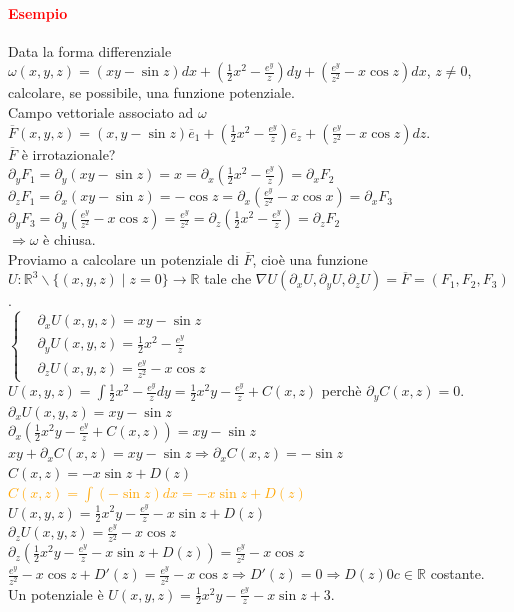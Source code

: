\documentclass{article}
\newcommand{\R}{\mathbb{R}}
\begin{document}
\paragraph{\textcolor{red}{Esempio}}
Data la forma differenziale $\omega(x,y,z)=(xy-\sin z)dx +\left(\frac{1}{2}x^2-\frac{e^y}{z} \right)dy+\left( \frac{e^y}{z^2}-x\cos z \right)dx$, $z \neq 0$, calcolare, se possibile, una funzione potenziale.\\
Campo vettoriale associato ad $\omega$\\
$\overline{F}(x,y,z)=(x,y-\sin z)\overline{e}_1+\left( \frac{1}{2}x^2-\frac{e^y}{z} \right) \overline{e}_z+\left( \frac{e^y}{z^2}-x\cos z \right)dz$.\\
$\overline{F}$ è irrotazionale?\\
$\partial_yF_1=\partial_y(xy-\sin z)=x=\partial_x\left( \frac{1}{2}x^2-\frac{e^y}{z} \right)= \partial_xF_2$\\
$\partial_z F_1 =\partial_x (xy-\sin z)= -\cos z = \partial_x\left( \frac{e^y}{z^2}-x\cos x \right)=\partial_x F_3$\\
$\partial_yF_3=\partial_y\left( \frac{e^y}{z^2}-x\cos z \right)= \frac{e^y}{z^2}=\partial_z\left( \frac{1}{2}x^2-\frac{e^y}{z} \right)=\partial_zF_2$\\
$\Rightarrow \omega$ è chiusa.\\
Proviamo a calcolare un potenziale di $\overline{F}$, cioè una funzione $U:\R^3\backslash \{(x,y,z)\mid z=0\}\rightarrow \R$ tale che $\nabla U(\partial_xU,\partial_yU,\partial_zU)=\overline{F}=(F_1,F_2,F_3)$.\\
$\begin{cases}
    &\partial_xU(x,y,z)=xy-\sin z\\
    &\partial_y U(x,y,z)=\frac{1}{2}x^2-\frac{e^y}{z}\\
    &\partial_z U(x,y,z)=\frac{e^y}{z^2}-x\cos z
\end{cases}$\\
$U(x,y,z)=\int \frac{1}{2} x^2 -\frac{e^y}{z}dy=\frac{1}{2}x^2y-\frac{e^y}{z}+C(x,z)$ perchè $\partial_y C(x,z)=0$.\\
$\partial_xU(x,y,z)=xy-\sin z$\\
$\partial_x\left( \frac{1}{2}x^2y-\frac{e^y}{z}+C(x,z) \right)=xy-\sin z$\\$xy+\partial_xC(x,z)=xy-\sin z \Rightarrow \partial_xC(x,z)=-\sin z$\\
$C(x,z)=-x\sin z + D(z)$\\
\textcolor{orange}{$C(x,z)=\int (-\sin z)dx=-x\sin z+D(z)$}\\
$U(x,y,z)=\frac{1}{2}x^2y-\frac{e^y}{z}-x\sin z+D(z)$\\
$\partial_z U(x,y,z)=\frac{e^y}{z^2}-x\cos z$\\
$\partial_z\left( \frac{1}{2}x^2y-\frac{e^y}{z}-x\sin z + D(z) \right)=\frac{e^y}{z^2}-x\cos z$\\
$\frac{e^y}{z^2}-x\cos z+ D'(z)=\frac{e^y}{z^2}-x\cos z\Rightarrow D'(z)=0\Rightarrow D(z)0c \in \R$ costante.\\
Un potenziale è $U(x,y,z)=\frac{1}{2}x^2y-\frac{e^y}{z}-x\sin z +3$.
\end{document}
